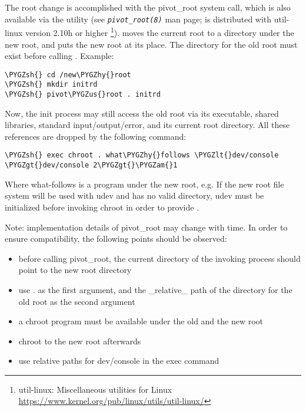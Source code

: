\documentclass[a4paper,8pt,english]{sphinxmanual}
\def\PYGZus{\char`\_}
\def\PYGZam{\char`\&}
\def\PYGZlt{\char`\<}
\def\PYGZgt{\char`\>}
\def\PYGZsh{\char`\#}
\def\PYGZhy{\char`\-}
\begin{document}
The root change is accomplished with the pivot\_root system call, which
is also available via the  utility (see \emph{\texttt{pivot\_root(8)}}
man page;  is distributed with util-linux version 2.10h or higher
\footnote[3]{
util-linux: Miscellaneous utilities for Linux
\href{https://www.kernel.org/pub/linux/utils/util-linux/}{https://www.kernel.org/pub/linux/utils/util-linux/}
}).  moves the current root to a directory under the new
root, and puts the new root at its place. The directory for the old root
must exist before calling . Example:

\begin{Verbatim}[commandchars=\\\{\}]
\PYGZsh{} cd /new\PYGZhy{}root
\PYGZsh{} mkdir initrd
\PYGZsh{} pivot\PYGZus{}root . initrd
\end{Verbatim}

Now, the init process may still access the old root via its
executable, shared libraries, standard input/output/error, and its
current root directory. All these references are dropped by the
following command:

\begin{Verbatim}[commandchars=\\\{\}]
\PYGZsh{} exec chroot . what\PYGZhy{}follows \PYGZlt{}dev/console \PYGZgt{}dev/console 2\PYGZgt{}\PYGZam{}1
\end{Verbatim}

Where what-follows is a program under the new root, e.g. 
If the new root file system will be used with udev and has no valid
 directory, udev must be initialized before invoking chroot in order
to provide .

Note: implementation details of pivot\_root may change with time. In order
to ensure compatibility, the following points should be observed:
\begin{itemize}
\item {} 
before calling pivot\_root, the current directory of the invoking
process should point to the new root directory

\item {} 
use . as the first argument, and the \_relative\_ path of the directory
for the old root as the second argument

\item {} 
a chroot program must be available under the old and the new root

\item {} 
chroot to the new root afterwards

\item {} 
use relative paths for dev/console in the exec command

\end{itemize}
\end{document}
